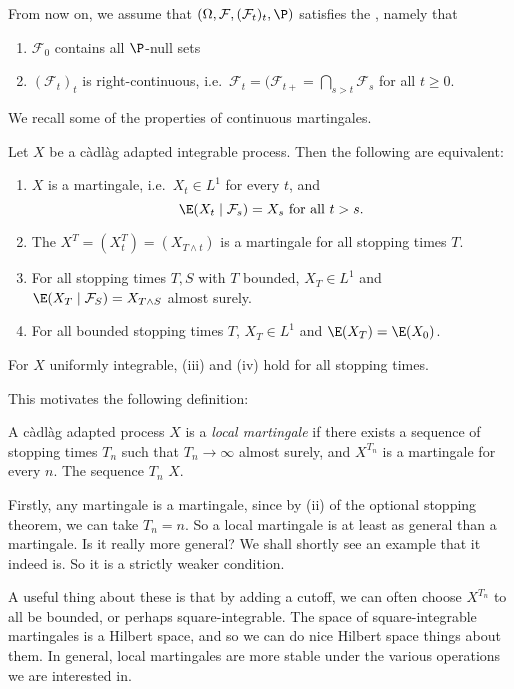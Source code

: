 \documentclass[a4paper]{article}
\begin{document}
From now on, we assume that $(\Omega, \mathcal{F}, (\mathcal{F}_t)_t, \P)$ satisfies the , namely that
\begin{enumerate}
  \item $\mathcal{F}_0$ contains all $\P$-null sets
  \item $(\mathcal{F}_t)_t$ is right-continuous, i.e.\ $\mathcal{F}_t = (\mathcal{F}_{t+} = \bigcap_{s > t} \mathcal{F}_s$ for all $t \geq 0$.
\end{enumerate}

We recall some of the properties of continuous martingales.
\begin{thm}
  Let $X$ be a c\`adl\`ag adapted integrable process. Then the following are equivalent:
  \begin{enumerate}
    \item $X$ is a martingale, i.e.\ $X_t \in L^1$ for every $t$, and
      \[
        \E(X_t \mid \mathcal{F}_s) = X_s \text{ for all }t > s.
      \]
    \item The  $X^T = (X^T_t) = (X_{T \wedge t})$ is a martingale for all stopping times $T$.
    \item For all stopping times $T, S$ with $T$ bounded, $X_T \in L^1$ and $\E(X_T \mid \mathcal{F}_S) = X_{T \wedge S}$ almost surely.
    \item For all bounded stopping times $T$, $X_T \in L^1$ and $\E(X_T) = \E(X_0)$.
  \end{enumerate}
  For $X$ uniformly integrable, (iii) and (iv) hold for all stopping times.
\end{thm}

This motivates the following definition:
\begin{defi}
  A c\`adl\`ag adapted process $X$ is a \emph{local martingale} if there exists a sequence of stopping times $T_n$ such that $T_n \to \infty$ almost surely, and $X^{T_n}$ is a martingale for every $n$. The sequence $T_n$  $X$.
\end{defi}

Firstly, any martingale is a martingale, since by (ii) of the optional stopping theorem, we can take $T_n = n$. So a local martingale is at least as general than a martingale. Is it really more general? We shall shortly see an example that it indeed is. So it is a strictly weaker condition.

A useful thing about these is that by adding a cutoff, we can often choose $X^{T_n}$ to all be bounded, or perhaps square-integrable. The space of square-integrable martingales is a Hilbert space, and so we can do nice Hilbert space things about them. In general, local martingales are more stable under the various operations we are interested in.
\end{document}
